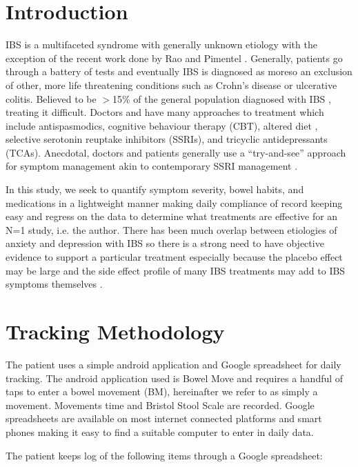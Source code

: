\documentclass[conference]{IEEEtran}
\begin{document}
\section{Introduction}
IBS is a multifaceted syndrome with generally unknown etiology with the exception of the recent work done by Rao \cite{erdogan2015small} and Pimentel \cite{pimentel2000eradication}.  Generally, patients go through a battery of tests and eventually IBS is diagnosed as moreso an exclusion of other, more life threatening conditions such as Crohn's disease or ulcerative colitis.   Believed to be $>$15\% of the general population diagnosed with IBS \cite{drossman1982bowel}, treating it difficult.  Doctors and have many approaches to treatment which include antispasmodics, cognitive behaviour therapy (CBT), altered diet \cite{gibson2010evidence}, selective serotonin reuptake inhibitors (SSRIs), and tricyclic antidepressants (TCAs). Anecdotal, doctors and patients generally use a “try-and-see” approach for symptom management akin to contemporary SSRI management \cite{trivedi2006evaluation}.

In this study, we seek to quantify symptom severity, bowel habits, and medications in a lightweight manner making daily compliance of record keeping easy and regress on the data to determine what treatments are effective for an N=1 study, i.e. the author.  There has been much overlap between etiologies of anxiety and depression with IBS so there is a strong need to have objective evidence to support a particular treatment especially because the placebo effect \cite{kaptchuk2008components} may be large and the side effect profile of many IBS treatments may add to IBS symptoms themselves \cite{vanderhoff2002proton}.

\section{Tracking Methodology}

The patient uses a simple android application and Google spreadsheet for daily tracking.  The android application used is Bowel Move \cite{bowelmove2017} and requires a handful of taps to enter a bowel movement (BM), hereinafter we refer to as simply a movement. Movements time and Bristol Stool Scale \cite{lewis1997stool} are recorded.  Google spreadsheets are available on most internet connected platforms and smart phones making it easy to find a suitable computer to enter in daily data.

The patient keeps log of the following items through a Google spreadsheet:
\end{document}
